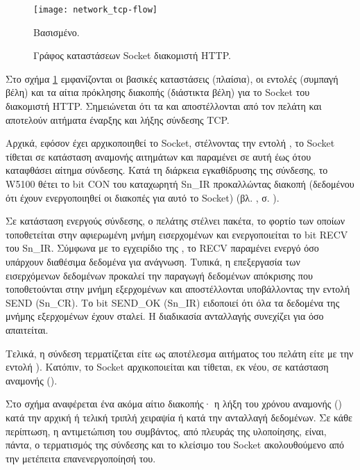 \begin{figure}
    \caption{Γράφος καταστάσεων Socket διακομιστή HTTP.
    \label{fig:network:tcp-flow}}
    \begin{center}
    \texttt{[image: network\_tcp-flow]}
    \end{center}
    Βασισμένο. 
\end{figure}

Στο σχήμα \ref{fig:network:tcp-flow} εμφανίζονται οι βασικές καταστάσεις
(πλαίσια), οι εντολές (συμπαγή βέλη) και τα αίτια πρόκλησης διακοπής (διάστικτα
βέλη) για το Socket του διακομιστή HTTP. Σημειώνεται ότι τα 
και  αποστέλλονται από τον πελάτη και αποτελούν αιτήματα
έναρξης και λήξης σύνδεσης TCP.

Αρχικά, εφόσον έχει αρχικοποιηθεί το Socket, στέλνοντας την εντολή ,
το Socket τίθεται σε κατάσταση αναμονής αιτημάτων και παραμένει σε αυτή έως ότου
καταφθάσει αίτημα σύνδεσης. Κατά τη διάρκεια εγκαθίδρυσης της σύνδεσης, το W5100
θέτει το bit CON του καταχωρητή Sn\_IR προκαλλώντας διακοπή (δεδομένου ότι έχουν
ενεργοποιηθεί οι διακοπές για αυτό το Socket) (βλ.
, σ. \pageref{ssubsec:network:ir_imr}).

Σε κατάσταση ενεργούς σύνδεσης, ο πελάτης στέλνει πακέτα, το φορτίο των οποίων
τοποθετείται στην αφιερωμένη μνήμη εισερχομένων και ενεργοποιείται το bit RECV
του Sn\_IR. Σύμφωνα με το εγχειρίδιο της \textcite[28]{wiz11:w5100}, το RECV
παραμένει ενεργό όσο υπάρχουν διαθέσιμα δεδομένα για ανάγνωση. Τυπικά, η
επεξεργασία των εισερχόμενων δεδομένων προκαλεί την παραγωγή δεδομένων απόκρισης
που τοποθετούνται στην μνήμη εξερχομένων και αποστέλλονται υποβάλλοντας την
εντολή SEND (Sn\_CR). Το bit SEND\_OK (Sn\_IR) ειδοποιεί ότι όλα τα δεδομένα της
μνήμης εξερχομένων έχουν σταλεί. Η διαδικασία ανταλλαγής συνεχίζει για όσο
απαιτείται.

Τελικά, η σύνδεση τερματίζεται είτε ως αποτέλεσμα αιτήματος του πελάτη είτε με
την εντολή ). Κατόπιν, το Socket αρχικοποιείται και τίθεται, εκ νέου,
σε κατάσταση αναμονής ().

Στο σχήμα αναφέρεται ένα ακόμα αίτιο διακοπής· η λήξη του χρόνου αναμονής
() κατά την αρχική ή τελική τριπλή χειραψία ή κατά την ανταλλαγή
δεδομένων. Σε κάθε περίπτωση, η αντιμετώπιση του συμβάντος, από πλευράς της
υλοποίησης, είναι, πάντα, ο τερματισμός της σύνδεσης και το κλείσιμο του Socket
ακολουθούμενο από την μετέπειτα επανενεργοποίησή του.

